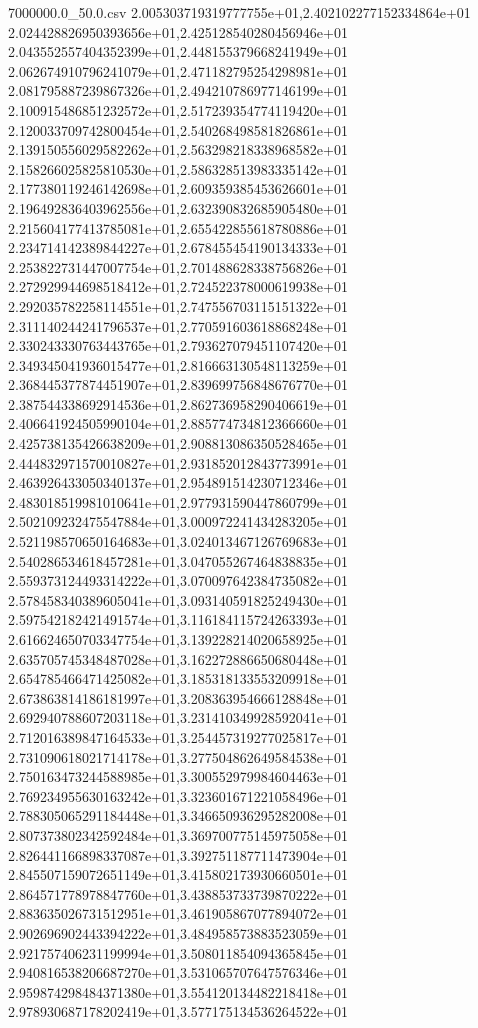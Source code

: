 \begin{filecontents*}{7000000.0_50.0.csv}
2.005303719319777755e+01,2.402102277152334864e+01
2.024428826950393656e+01,2.425128540280456946e+01
2.043552557404352399e+01,2.448155379668241949e+01
2.062674910796241079e+01,2.471182795254298981e+01
2.081795887239867326e+01,2.494210786977146199e+01
2.100915486851232572e+01,2.517239354774119420e+01
2.120033709742800454e+01,2.540268498581826861e+01
2.139150556029582262e+01,2.563298218338968582e+01
2.158266025825810530e+01,2.586328513983335142e+01
2.177380119246142698e+01,2.609359385453626601e+01
2.196492836403962556e+01,2.632390832685905480e+01
2.215604177413785081e+01,2.655422855618780886e+01
2.234714142389844227e+01,2.678455454190134333e+01
2.253822731447007754e+01,2.701488628338756826e+01
2.272929944698518412e+01,2.724522378000619938e+01
2.292035782258114551e+01,2.747556703115151322e+01
2.311140244241796537e+01,2.770591603618868248e+01
2.330243330763443765e+01,2.793627079451107420e+01
2.349345041936015477e+01,2.816663130548113259e+01
2.368445377874451907e+01,2.839699756848676770e+01
2.387544338692914536e+01,2.862736958290406619e+01
2.406641924505990104e+01,2.885774734812366660e+01
2.425738135426638209e+01,2.908813086350528465e+01
2.444832971570010827e+01,2.931852012843773991e+01
2.463926433050340137e+01,2.954891514230712346e+01
2.483018519981010641e+01,2.977931590447860799e+01
2.502109232475547884e+01,3.000972241434283205e+01
2.521198570650164683e+01,3.024013467126769683e+01
2.540286534618457281e+01,3.047055267464838835e+01
2.559373124493314222e+01,3.070097642384735082e+01
2.578458340389605041e+01,3.093140591825249430e+01
2.597542182421491574e+01,3.116184115724263393e+01
2.616624650703347754e+01,3.139228214020658925e+01
2.635705745348487028e+01,3.162272886650680448e+01
2.654785466471425082e+01,3.185318133553209918e+01
2.673863814186181997e+01,3.208363954666128848e+01
2.692940788607203118e+01,3.231410349928592041e+01
2.712016389847164533e+01,3.254457319277025817e+01
2.731090618021714178e+01,3.277504862649584538e+01
2.750163473244588985e+01,3.300552979984604463e+01
2.769234955630163242e+01,3.323601671221058496e+01
2.788305065291184448e+01,3.346650936295282008e+01
2.807373802342592484e+01,3.369700775145975058e+01
2.826441166898337087e+01,3.392751187711473904e+01
2.845507159072651149e+01,3.415802173930660501e+01
2.864571778978847760e+01,3.438853733739870222e+01
2.883635026731512951e+01,3.461905867077894072e+01
2.902696902443394222e+01,3.484958573883523059e+01
2.921757406231199994e+01,3.508011854094365845e+01
2.940816538206687270e+01,3.531065707647576346e+01
2.959874298484371380e+01,3.554120134482218418e+01
2.978930687178202419e+01,3.577175134536264522e+01

\end{filecontents*}
